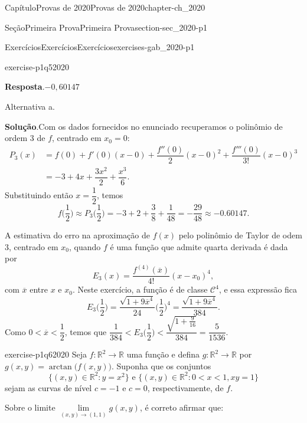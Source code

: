 \documentclass[oneside,10pt,]{book}
\newcommand{\blocktitlefont}{\relax}
\numberwithin{equation}{section}
\newcommand{\R}{\mathbb R}
\begin{document}
\begin{chapterptx}{Capítulo}{Provas de 2020}{}{Provas de 2020}{}{}{chapter-ch_2020}
\begin{sectionptx}{Seção}{Primeira Prova}{}{Primeira Prova}{}{}{section-sec_2020-p1}
\begin{exercises-subsection-numberless}{Exercícios}{Exercícios}{}{Exercícios}{}{}{exercises-gab_2020-p1}
\begin{divisionexercise}{5}{}{}{exercise-p1q52020}
%
\par\smallskip%
\noindent\textbf{\blocktitlefont Resposta}.\hypertarget{answer-p1q52020-b}{}\quad{}\(-0,60147\)%
\par
Alternativa a.%
\par\smallskip%
\noindent\textbf{\blocktitlefont Solução}.\hypertarget{solution-p1q52020-c}{}\quad{}Com os dados fornecidos no enunciado recuperamos o polinômio de ordem \(3\) de \(f\), centrado em \(x_0=0\):%
\begin{align*}
P_3(x)&=f(0)+f'(0)(x-0)+\dfrac{f''(0)}{2}(x-0)^2
+\dfrac{f'''(0)}{3!}(x-0)^3\\
&=-3+4x+\dfrac{3x^2}{2}+\dfrac{x^3}{6}.
\end{align*}
Substituindo então  \(x=\dfrac{1}{2}\), temos%
\begin{equation*}
f\big(\dfrac{1}{2}\big)\approx
P_3\big(\dfrac{1}{2}\big)=-3+2+\dfrac{3}{8}+\dfrac{1}{48}
=-\dfrac{29}{48}\approx -0.60147.
\end{equation*}
%
\par
A estimativa do erro na aproximação de \(f(x)\) pelo polinômio de Taylor de odem \(3\), centrado em \(x_0\), quando \(f\) é uma função que admite quarta derivada é dada por%
\begin{equation*}
E_3(x)=\dfrac{f^{(4)}(\overline{x})}{4!}(x-x_0)^4,
\end{equation*}
com \(\overline{x}\) entre \(x\) e \(x_0\). Neste exercício, a função é de classe \(\mathscr{C}^4\), e essa expressão fica%
\begin{equation*}
E_3\big(\dfrac{1}{2}\big)=
\dfrac{\sqrt{1+9\overline{x}^4}}{24}\big(\frac{1}{2}\big)^4=
\dfrac{\sqrt{1+9\overline{x}^4}}{384}.
\end{equation*}
Como \(0<\overline{x}<\dfrac{1}{2}\), temos que \(\dfrac{1}{384}< E_3\big(\dfrac{1}{2}\big)<
\dfrac{\sqrt{1+\frac{9}{16}}}{384}=\dfrac{5}{1536}\).%
\end{divisionexercise}%
\begin{divisionexercise}{6}{}{}{exercise-p1q62020}%
Seja \(f\colon\R^2\to\R\) uma função e defina \(g\colon\R^2\to\R\) por \(g(x,y) = \arctan
\big(f(x,y)\big)\). Suponha que os conjuntos%
\begin{equation*}
\big\{(x,y)
\in \mathbb {R}^2\colon y = x^2\big\}\text{ e } \big\{ (x,y) \in
\mathbb {R}^2\colon 0<x<1, xy = 1\big\}
\end{equation*}
sejam as curvas de nível \(c=-1\) e \(c=0\), respectivamente, de \(f\).%
\par
Sobre o limite \(\lim \limits _{(x,y) \to (1,1)} g(x,y)\), é correto afirmar que:%

\end{divisionexercise}
\end{exercises-subsection-numberless}
\end{sectionptx}
\end{chapterptx}
\end{document}
